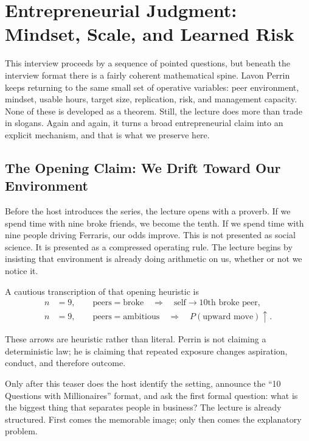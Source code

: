 \chapter{Entrepreneurial Judgment: Mindset, Scale, and Learned Risk}

This interview proceeds by a sequence of pointed questions, but beneath the interview format there is a fairly coherent mathematical spine. Lavon Perrin keeps returning to the same small set of operative variables: peer environment, mindset, usable hours, target size, replication, risk, and management capacity. None of these is developed as a theorem. Still, the lecture does more than trade in slogans. Again and again, it turns a broad entrepreneurial claim into an explicit mechanism, and that is what we preserve here.

\section{The Opening Claim: We Drift Toward Our Environment}

Before the host introduces the series, the lecture opens with a proverb. If we spend time with nine broke friends, we become the tenth. If we spend time with nine people driving Ferraris, our odds improve. This is not presented as social science. It is presented as a compressed operating rule. The lecture begins by insisting that environment is already doing arithmetic on us, whether or not we notice it.

A cautious transcription of that opening heuristic is
\begin{align}
n &= 9, \qquad \text{peers} = \text{broke}
\quad \Longrightarrow \quad
\text{self} \to \text{10th broke peer},\\
n &= 9, \qquad \text{peers} = \text{ambitious}
\quad \Longrightarrow \quad
P(\text{upward move}) \uparrow .
\end{align}

\begin{remark}
These arrows are heuristic rather than literal. Perrin is not claiming a deterministic law; he is claiming that repeated exposure changes aspiration, conduct, and therefore outcome.
\end{remark}

Only after this teaser does the host identify the setting, announce the ``10 Questions with Millionaires'' format, and ask the first formal question: what is the biggest thing that separates people in business? The lecture is already structured. First comes the memorable image; only then comes the explanatory problem.

